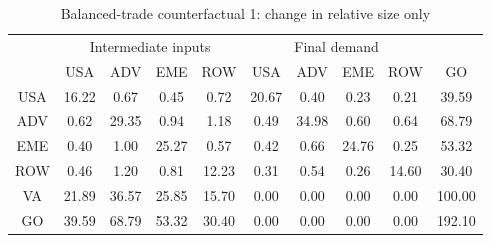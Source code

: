 \begin{table}[p]
\begin{center}
\caption{Balanced-trade counterfactual 1: change in relative size only}
\label{tab:iomat-bal-size-counter}
\small
\begin{tabular}{cccccccccc}
\toprule
& \multicolumn{4}{c}{Intermediate inputs}& \multicolumn{4}{c}{Final demand} & \\
\cmidrule(rl){2-5}\cmidrule(rl){6-9}
 &USA &ADV &EME &ROW &USA &ADV &EME &ROW& GO\\
\midrule
USA& 16.22& 0.67& 0.45& 0.72& 20.67& 0.40& 0.23& 0.21& 39.59 \\
ADV& 0.62& 29.35& 0.94& 1.18& 0.49& 34.98& 0.60& 0.64& 68.79 \\
EME& 0.40& 1.00& 25.27& 0.57& 0.42& 0.66& 24.76& 0.25& 53.32 \\
ROW& 0.46& 1.20& 0.81& 12.23& 0.31& 0.54& 0.26& 14.60& 30.40 \\
\midrule
VA& 21.89& 36.57& 25.85& 15.70& 0.00& 0.00& 0.00& 0.00& 100.00\\
\midrule
GO& 39.59& 68.79& 53.32& 30.40& 0.00& 0.00& 0.00& 0.00& 192.10\\
\bottomrule
\end{tabular}
\normalsize
\end{center}
\end{table}
